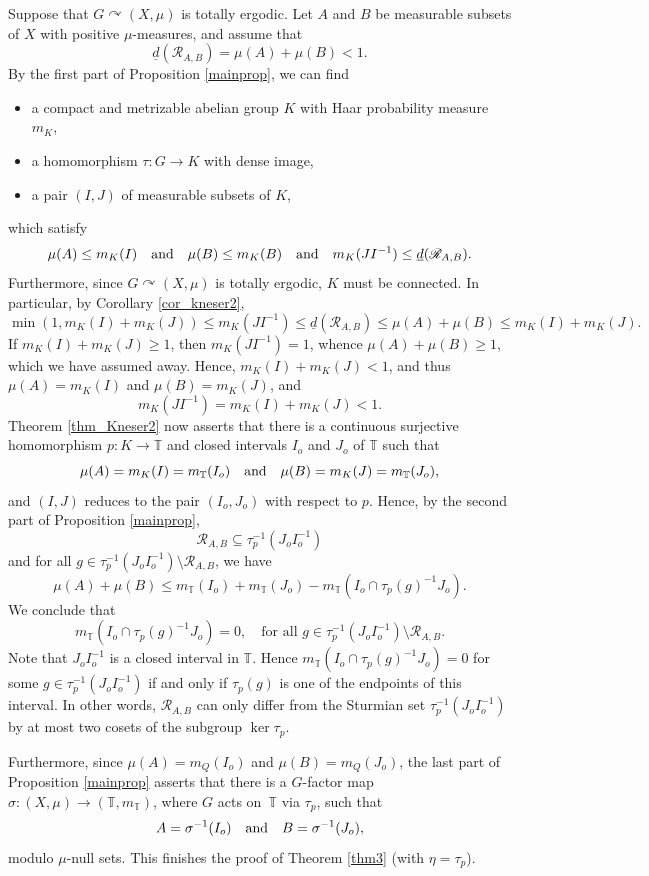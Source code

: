 \documentclass[JEP,XML,SOM,Unicode]{cedram}
\let\mathcal\mathscr
\newcommand{\cR}{\mathcal{R}}
\newcommand{\bT}{\mathbb{T}}
\newcommand{\qand}{\quad\textup{and}\quad}
\let\acts\curvearrowright
\theoremstyle{plain}
\theoremstyle{definition}
\begin{document}
Suppose that $G \acts (X,\mu)$ is totally ergodic. Let $A$ and $B$ be measurable subsets of $X$ with positive $\mu$-measures,
and assume that
\[
\underline{d}(\cR_{A,B}) = \mu(A) + \mu(B) < 1.
\]
By the first part of Proposition \ref{mainprop}, we can find
\begin{itemize}
\item a compact and metrizable abelian group $K$ with Haar probability measure $m_K$,
\item a homomorphism $\tau : G \to K$ with dense image,
\item a pair $(I,J)$ of measurable subsets of $K$,
\end{itemize}
which satisfy
\[
\mu(A) \leq m_K(I) \qand \mu(B) \leq m_K(B) \qand m_K(JI^{-1}) \leq \underline{d}(\cR_{A,B}).
\]
Furthermore, since $G \acts (X,\mu)$ is totally ergodic, $K$ must be connected. In particular, by
Corollary \ref{cor_kneser2},
\[
\min(1,m_K(I) + m_K(J)) \leq m_K(JI^{-1}) \leq \underline{d}(\cR_{A,B}) \leq \mu(A) + \mu(B) \leq m_K(I) + m_K(J).
\]
If $m_K(I) + m_K(J) \geq 1$, then $m_K(JI^{-1}) = 1$, whence $\mu(A) + \mu(B) \geq 1$, which we have assumed away.
Hence, $m_K(I) + m_K(J) < 1$, and thus $\mu(A) = m_K(I)$ and $\mu(B) = m_K(J)$, and
\[
m_K(JI^{-1}) = m_K(I) + m_K(J) < 1.
\]
Theorem \ref{thm_Kneser2} now asserts
that there is a continuous surjective homomorphism \hbox{$p : K \to \bT$} and closed intervals $I_o$ and $J_o$ of $\bT$
such that
\[
\mu(A) = m_K(I) = m_\bT(I_o) \qand \mu(B) = m_K(J) = m_\bT(J_o),
\]
and $(I,J)$ reduces to the pair $(I_o,J_o)$ with respect to $p$. Hence, by the second part of Proposition \ref{mainprop},
\[
\cR_{A,B} \subseteq \tau_p^{-1}(J_o I_o^{-1})
\]
and for all $g \in \tau_p^{-1}(J_o I_o^{-1}) \setminus \cR_{A,B}$, we have
\[
\mu(A) + \mu(B) \leq m_\bT(I_o) + m_\bT(J_o) - m_\bT(I_o \cap \tau_p(g)^{-1}J_o).
\]
We conclude that
\[
m_\bT(I_o \cap \tau_p(g)^{-1}J_o) = 0, \quad \textrm{for all $g \in \tau_p^{-1}(J_o I_o^{-1}) \setminus \cR_{A,B}$}.
\]
Note that $J_o I_o^{-1}$ is a closed interval in $\bT$. Hence $m_\bT(I_o \cap \tau_p(g)^{-1}J_o) = 0$ for some
$g \in \tau_p^{-1}(J_o I_o^{-1})$ if and only if $\tau_p(g)$ is one of the endpoints of this interval. In other words,
$\cR_{A,B}$ can only differ from the Sturmian set $\tau_p^{-1}(J_o I_o^{-1})$ by at most two cosets of the
subgroup $\ker \tau_p$.

Furthermore, since $\mu(A) = m_Q(I_o)$ and $\mu(B) = m_Q(J_o)$, the last part of Proposition \ref{mainprop} asserts
that there is a $G$-factor map $\sigma : (X,\mu) \to (\bT,m_{\bT})$, where $G$ acts on~$\bT$ via $\tau_p$, such that
\[
A = \sigma^{-1}(I_o) \qand B = \sigma^{-1}(J_o),
\]
modulo $\mu$-null sets. This finishes the proof of Theorem \ref{thm3} (with $\eta = \tau_p$).
\end{document}
